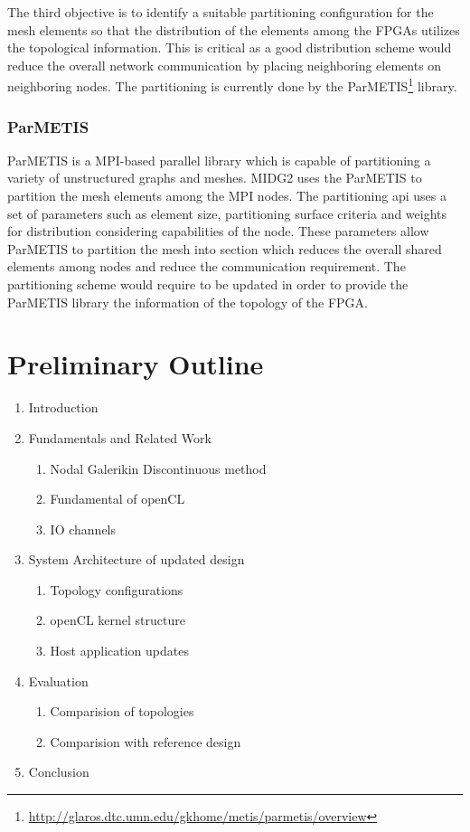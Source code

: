 \documentclass[english,notitlepage]{hgbreport}
\begin{document}
The third objective is to identify a suitable partitioning configuration for the mesh elements so that
the distribution of the elements among the FPGAs utilizes the topological information. This is critical
as a good distribution scheme would reduce the overall network communication by placing neighboring elements
on neighboring nodes. The partitioning is currently done by the ParMETIS\footnote{\url{http://glaros.dtc.umn.edu/gkhome/metis/parmetis/overview}}
library. 

\subsubsection{ParMETIS}

ParMETIS is a MPI-based parallel library which is capable of partitioning a variety of unstructured graphs and meshes. MIDG2
uses the ParMETIS to partition the mesh elements among the MPI nodes. The partitioning api uses a set of parameters such as element
size, partitioning surface criteria and weights for distribution considering capabilities of the node. These parameters allow
ParMETIS to partition the mesh into section which reduces the overall shared elements among nodes and reduce the communication requirement.
The partitioning scheme would require to be updated in order to provide the ParMETIS library the information of the topology of the FPGA.

\section{Preliminary Outline}
\begin{enumerate}
	\item Introduction
	\item Fundamentals and Related Work
	\begin{enumerate}
		\item Nodal Galerikin Discontinuous method
		\item Fundamental of openCL
		\item IO channels
	\end{enumerate}
	\item System Architecture of updated design
	\begin{enumerate}
		\item Topology configurations
		\item openCL kernel structure
		\item Host application updates
	\end{enumerate}
	\item Evaluation
	\begin{enumerate}
		\item Comparision of topologies
		\item Comparision with reference design
	\end{enumerate}
	\item Conclusion

\end{enumerate}
\end{document}
